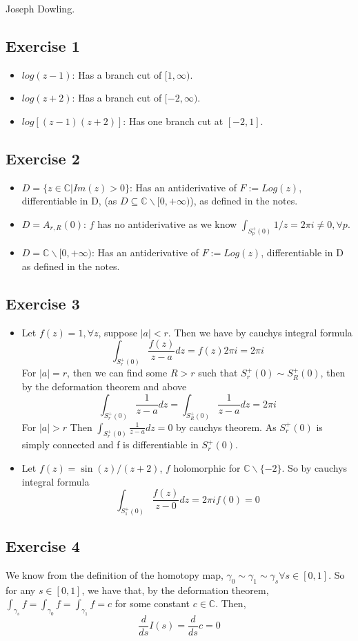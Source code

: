 \documentclass[a4paper, 12pt, twoside]{article}
\author{Joseph}
\begin{document}
Joseph Dowling.
\subsection*{Exercise 1}
\begin{itemize}
    \item[I)] $log(z-1)$: Has a branch cut of $[1,\infty)$.
    \item[II)] $log(z+2)$: Has a branch cut of $[-2,\infty)$.
    \item[III)] $log[(z-1)(z+2)]$: Has one branch cut at $[-2,1]$.
\end{itemize}
\subsection*{Exercise 2}
\begin{itemize}
    \item[I)] $D=\{z\in \mathbb{C}|Im(z)>0\}$: Has an antiderivative of $F:=Log(z)$, differentiable in D, (as $D\subseteq  \mathbb{C}\backslash[0,+\infty)$), as defined in the notes.
    \item[II)] $D=A_{r,R}(0)$: $f$ has no antiderivative as we know $\int_{S_{p}^{+}(0)}1/z=2\pi i\neq0, \forall p$.
    \item[III)] $D= \mathbb{C}\backslash[0,+\infty)$: Has an antiderivative of $F:=Log(z)$, differentiable in D as defined in the notes.
\end{itemize}
\subsection*{Exercise 3}
\begin{itemize}
    \item[I)] Let $f(z)=1,\forall z$, suppose $|a|< r$. Then we have by cauchys integral formula
    $$\int_{S^{+}_{r}(0)}\frac{f(z)}{z-a}dz=f(z)2\pi i=2\pi i $$
    For $|a|=r$, then we can find some $R>r$ such that $S^{+}_{r}(0)\sim S^{+}_{R}(0) $, then by the deformation theorem and above
    $$ \int_{S^{+}_{r}(0)}\frac{1}{z-a}dz=\int_{S^{+}_{R}(0)}\frac{1}{z-a}dz=2\pi i$$
    For  $|a|>r$ Then $\int_{S^{+}_{r}(0)}\frac{1}{z-a}dz=0$ by cauchys theorem. As $S^{+}_{r}(0)$ is simply connected and f is differentiable in $S^{+}_{r}(0)$.
    \item[II)] Let $f(z)=\sin(z)/(z+2)$, $f$ holomorphic for $\mathbb{C}\backslash\{-2\}$. So by cauchys integral formula
    $$\int_{S^{+}_{1}(0)}\frac{f(z)}{z-0}dz=2\pi if(0)=0 $$
\end{itemize}
\subsection*{Exercise 4}
We know from the definition of the homotopy map, $\gamma_{0}\sim\gamma_{1}\sim\gamma_{s} \forall s\in[0,1]$. So for any $s\in[0,1]$, we have that, by the deformation theorem, $\int_{\gamma_{s}}f= \int_{\gamma_{0}}f= \int_{\gamma_{1}}f=c$ for some constant $c\in \mathbb{C}$. Then,
$$\frac{d}{ds}I(s)=\frac{d}{ds}c=0 $$
\end{document}
